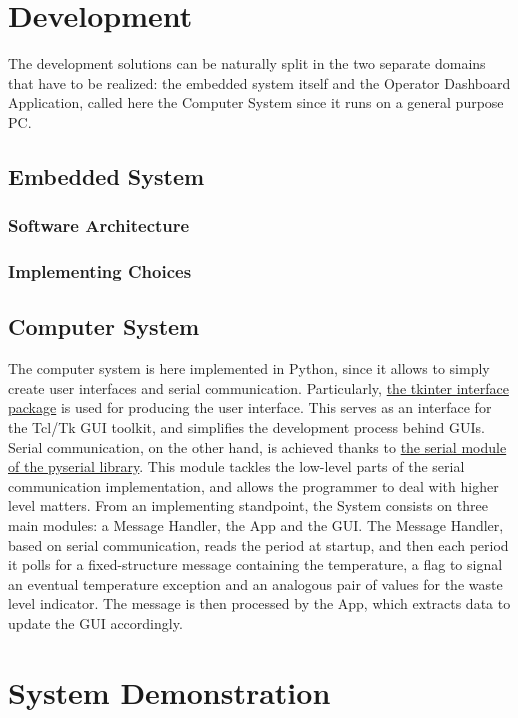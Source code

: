 \documentclass[a4paper,12pt]{report}
\begin{document}
	\chapter{Development}
	The development solutions can be naturally split in the two separate domains that have to be realized: the embedded system itself and the Operator Dashboard Application, called here the Computer System since it runs on a general purpose PC. 
	
	\section{Embedded System}
	
	\subsection{Software Architecture}
	
	\subsection{Implementing Choices}
	
	\section{Computer System}
	The computer system is here implemented in Python, since it allows to simply create user interfaces and serial communication.\newline
	Particularly, \href{https://docs.python.org/3/library/tkinter.html}{the tkinter interface package} is used for producing the user interface. This serves as an interface for the Tcl/Tk GUI toolkit, and simplifies the development process behind GUIs.\newline
	Serial communication, on the other hand, is achieved thanks to \href{https://pyserial.readthedocs.io/en/latest/}{the serial module of the pyserial library}. This module tackles the low-level parts of the serial communication implementation, and allows the programmer to deal with higher level matters.\newline
	From an implementing standpoint, the System consists on three main modules: a Message Handler, the App and the GUI. The Message Handler, based on serial communication, reads the period at startup, and then each period it polls for a fixed-structure message containing the temperature, a flag to signal an eventual temperature exception and an analogous pair of values for the waste level indicator. The message is then processed by the App, which extracts data to update the GUI accordingly.
	
	\chapter{System Demonstration}
	
\end{document}
